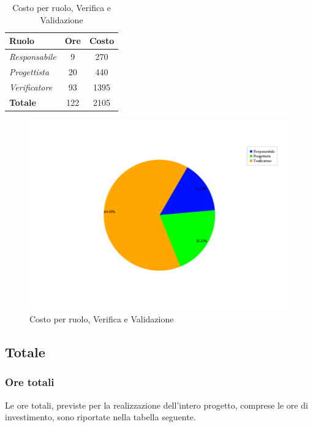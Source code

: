 \begin{table}[H]
	\begin{center}
		\begin{tabular}{|l|c|c|}
			\hline
			\textbf{Ruolo}	& \textbf{Ore} &	\textbf{Costo}	 \\
			\hline
			\textit{Responsabile}	&	9	&	270		\\
			\hline
			\textit{Progettista}		&	20	&	440		\\
			\hline
			\textit{Verificatore}	&	93	&	1395	\\
			\hline
			\textbf{Totale}	&	122	&	2105	\\
			\hline
		\end{tabular}
	\end{center}
	\caption{Costo per ruolo, Verifica e Validazione}
\end{table}

\begin{figure}[H]
	\centering
	\includegraphics[scale=0.4]{immagini/Grafi/CostoVV}
	\caption{Costo per ruolo, Verifica e Validazione}
\end{figure}

\subsection{Totale}
\subsubsection{Ore totali}
Le ore totali, previste per la realizzazione dell'intero progetto, comprese le ore di investimento, sono riportate nella tabella seguente.

